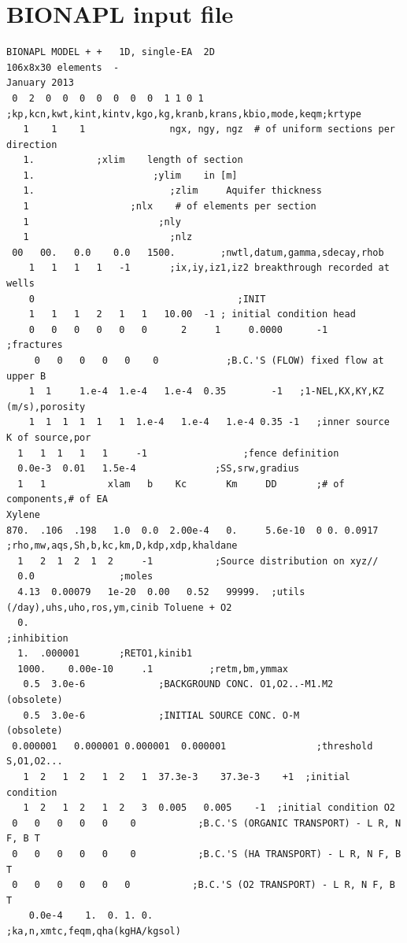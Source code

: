 \documentclass[12pt,twoside]{report}
\begin{document}
\section{BIONAPL input file}
\begin{verbatim}
BIONAPL MODEL + +   1D, single-EA  2D 
106x8x30 elements  - 
January 2013
 0  2  0  0  0  0  0  0  0  1 1 0 1 ;kp,kcn,kwt,kint,kintv,kgo,kg,kranb,krans,kbio,mode,keqm;krtype
   1    1    1               ngx, ngy, ngz  # of uniform sections per direction
   1.           ;xlim    length of section
   1.                     ;ylim    in [m]
   1.                        ;zlim     Aquifer thickness
   1                  ;nlx    # of elements per section
   1                       ;nly
   1                         ;nlz
 00   00.   0.0    0.0   1500.        ;nwtl,datum,gamma,sdecay,rhob
    1   1   1   1   -1       ;ix,iy,iz1,iz2 breakthrough recorded at wells
    0                                    ;INIT
    1   1   1   2   1   1   10.00  -1 ; initial condition head
    0   0   0   0   0   0      2     1     0.0000      -1    ;fractures
     0   0   0   0   0    0            ;B.C.'S (FLOW) fixed flow at upper B
    1  1     1.e-4  1.e-4   1.e-4  0.35        -1   ;1-NEL,KX,KY,KZ (m/s),porosity
    1  1  1  1  1   1  1.e-4   1.e-4   1.e-4 0.35 -1   ;inner source   K of source,por
  1   1  1   1   1     -1                 ;fence definition
  0.0e-3  0.01   1.5e-4              ;SS,srw,gradius
  1   1           xlam   b    Kc       Km     DD       ;# of components,# of EA
Xylene 
870.  .106  .198   1.0  0.0  2.00e-4   0.     5.6e-10  0 0. 0.0917  ;rho,mw,aqs,Sh,b,kc,km,D,kdp,xdp,khaldane
  1   2  1  2  1  2     -1           ;Source distribution on xyz//
  0.0               ;moles
  4.13  0.00079   1e-20  0.00   0.52   99999.  ;utils (/day),uhs,uho,ros,ym,cinib Toluene + O2
  0.                                                           ;inhibition 
  1.  .000001       ;RETO1,kinib1
  1000.    0.00e-10     .1          ;retm,bm,ymmax
   0.5  3.0e-6             ;BACKGROUND CONC. O1,O2..-M1.M2   (obsolete)
   0.5  3.0e-6             ;INITIAL SOURCE CONC. O-M         (obsolete)
 0.000001   0.000001 0.000001  0.000001                ;threshold S,O1,O2...
   1  2   1  2   1  2   1  37.3e-3    37.3e-3    +1  ;initial condition
   1  2   1  2   1  2   3  0.005   0.005    -1  ;initial condition O2 
 0   0   0   0   0    0           ;B.C.'S (ORGANIC TRANSPORT) - L R, N F, B T
 0   0   0   0   0    0           ;B.C.'S (HA TRANSPORT) - L R, N F, B T
 0   0   0   0   0   0           ;B.C.'S (O2 TRANSPORT) - L R, N F, B T
    0.0e-4    1.  0. 1. 0.                    ;ka,n,xmtc,feqm,qha(kgHA/kgsol)

\end{verbatim}
\end{document}
